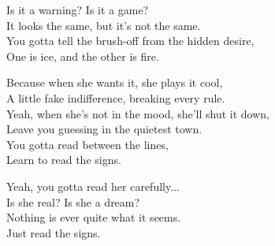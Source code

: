 \begin{lyrics}
​Is it a warning? Is it a game?\\
It looks the same, but it's not the same.\\
You gotta tell the brush-off from the hidden desire,\\
One is ice, and the other is fire.
 

​Because when she wants it, she plays it cool,\\
A little fake indifference, breaking every rule.\\
Yeah, when she’s not in the mood, she’ll shut it down,\\
Leave you guessing in the quietest town.\\
You gotta read between the lines,\\
Learn to read the signs.

​Yeah, you gotta read her carefully...\\
Is she real? Is she a dream?\\
Nothing is ever quite what it seems.\\
Just read the signs.

\end{lyrics}

